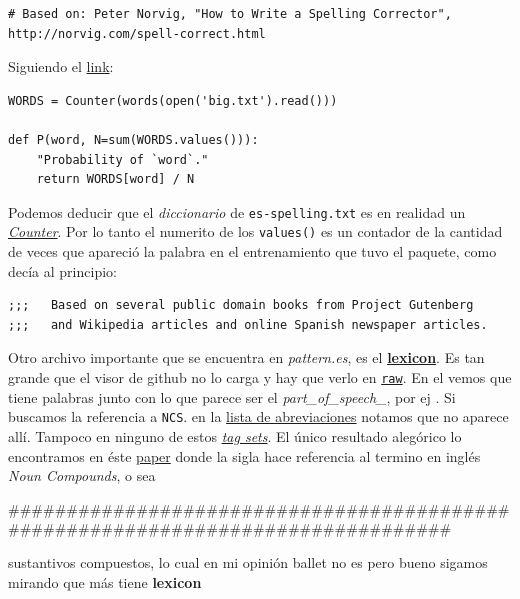 \begin{verbatim}
# Based on: Peter Norvig, "How to Write a Spelling Corrector", http://norvig.com/spell-correct.html
\end{verbatim}

Siguiendo el \href{http://norvig.com/spell-correct.html}{link}:

\begin{verbatim}
WORDS = Counter(words(open('big.txt').read()))

def P(word, N=sum(WORDS.values())):
    "Probability of `word`."
    return WORDS[word] / N
\end{verbatim}

Podemos deducir que el \emph{diccionario} de 
\texttt{es-spelling.txt} es en realidad un
\href{https://docs.python.org/2/library/collections.html\#collections.Counter}{\emph{Counter}}. Por lo tanto el numerito de los \texttt{values()} es un contador de la cantidad de veces que apareció la palabra en el entrenamiento que tuvo el paquete, como decía al principio:

\begin{verbatim}
;;;   Based on several public domain books from Project Gutenberg
;;;   and Wikipedia articles and online Spanish newspaper articles.
\end{verbatim}

Otro archivo importante que se encuentra en \emph{pattern.es},  es el
\href{https://github.com/clips/pattern/blob/master/pattern/text/es/es-lexicon.txt}{\textbf{lexicon}}.
Es tan grande que el visor de github no lo carga y hay que verlo en
\href{https://raw.githubusercontent.com/clips/pattern/master/pattern/text/es/es-lexicon.txt}{\texttt{raw}}.
En el vemos que tiene palabras junto con lo que parece ser el \emph{part\_of\_speech\_}, por ej . Si buscamos la referencia
a \texttt{NCS}. en la
\href{https://www.clips.uantwerpen.be/pages/MBSP-tags}{lista de abreviaciones}
notamos que no aparece allí. Tampoco en ninguno de estos
\href{https://www.sketchengine.eu/tagsets/english-part-of-speech-tagset/}{\emph{tag
sets}}. El único resultado alegórico lo encontramos en éste
\href{https://www.aclweb.org/anthology/C14-1099}{paper} donde la sigla
hace referencia al termino en inglés \emph{Noun Compounds}, o sea 

#################################################################################

sustantivos compuestos, lo cual en mi opinión ballet no es pero bueno
sigamos mirando que más tiene \textbf{lexicon}

